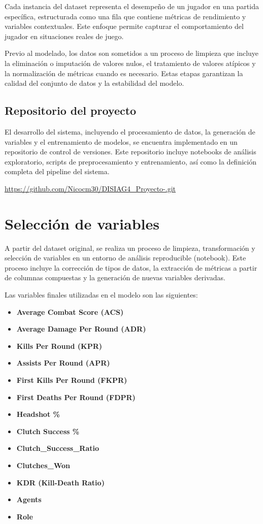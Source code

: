 \documentclass{ULBreport} %
\begin{document}
Cada instancia del dataset representa el desempeño de un jugador en una partida específica, estructurada como una fila que contiene métricas de rendimiento y variables contextuales. Este enfoque permite capturar el comportamiento del jugador en situaciones reales de juego.

Previo al modelado, los datos son sometidos a un proceso de limpieza que incluye la eliminación o imputación de valores nulos, el tratamiento de valores atípicos y la normalización de métricas cuando es necesario. Estas etapas garantizan la calidad del conjunto de datos y la estabilidad del modelo.

\subsection{Repositorio del proyecto}

El desarrollo del sistema, incluyendo el procesamiento de datos, la generación de variables y el entrenamiento de modelos, se encuentra implementado en un repositorio de control de versiones. Este repositorio incluye notebooks de análisis exploratorio, scripts de preprocesamiento y entrenamiento, así como la definición completa del pipeline del sistema.

\begin{center}
\url{https://github.com/Nicocm30/DISIAG4_Proyecto-.git}
\end{center}

\section{Selección de variables}

A partir del dataset original, se realiza un proceso de limpieza, transformación y selección de variables en un entorno de análisis reproducible (notebook). Este proceso incluye la corrección de tipos de datos, la extracción de métricas a partir de columnas compuestas y la generación de nuevas variables derivadas.

Las variables finales utilizadas en el modelo son las siguientes:

\begin{itemize}
    \item \textbf{Average Combat Score (ACS)}
    \item \textbf{Average Damage Per Round (ADR)}
    \item \textbf{Kills Per Round (KPR)}
    \item \textbf{Assists Per Round (APR)}
    \item \textbf{First Kills Per Round (FKPR)}
    \item \textbf{First Deaths Per Round (FDPR)}
    \item \textbf{Headshot \%}
    \item \textbf{Clutch Success \%}
    \item \textbf{Clutch\_Success\_Ratio}
    \item \textbf{Clutches\_Won}
    \item \textbf{KDR (Kill-Death Ratio)}
    \item \textbf{Agents}
    \item \textbf{Role}
\end{itemize}
\end{document}
